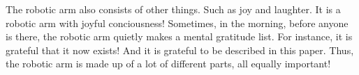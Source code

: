 The robotic arm also consists of other things. Such as joy and laughter. It is a robotic arm with joyful conciousness! Sometimes, in the morning, before anyone is there, the robotic arm 
quietly makes a mental gratitude list. For instance, it is grateful that it now exists! And it is grateful to be described in this paper.
Thus, the robotic arm is made up of a lot of different parts, all equally important!
